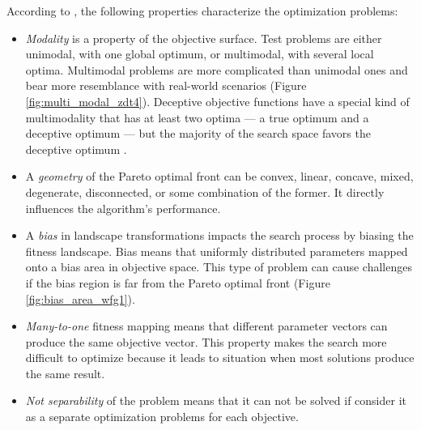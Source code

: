     According to \cite{WFGref}, the following properties characterize the optimization problems:
    \begin{itemize}
        \item \emph{Modality} is a property of the objective surface. Test problems are either unimodal, with one global optimum, or multimodal, with several local optima. Multimodal problems are more complicated than unimodal ones and bear more resemblance with real-world scenarios (Figure \ref{fig:multi_modal_zdt4}). Deceptive objective functions have a special kind of multimodality that has at least two optima — a true optimum and a deceptive optimum — but the majority of the search space favors the deceptive optimum \cite{Deb99}.
        \item A \emph{geometry} of the Pareto optimal front can be convex, linear, concave, mixed, degenerate, disconnected, or some combination of the former. It directly influences the algorithm's performance. 
        \item A \emph{bias} in landscape transformations impacts the search process by biasing the fitness landscape. Bias means that uniformly distributed parameters mapped onto a bias area in objective space. This type of problem can cause challenges if the bias region is far from the Pareto optimal front (Figure \ref{fig:bias_area_wfg1}).
        \item \emph{Many-to-one} fitness mapping means that different parameter vectors can produce the same objective vector. This property makes the search more difficult to optimize because it leads to situation when most solutions produce the same result.
        \item \emph{Not separability } of the problem means that it can not be solved if consider it as a separate optimization problems for each objective.
    \end{itemize}

